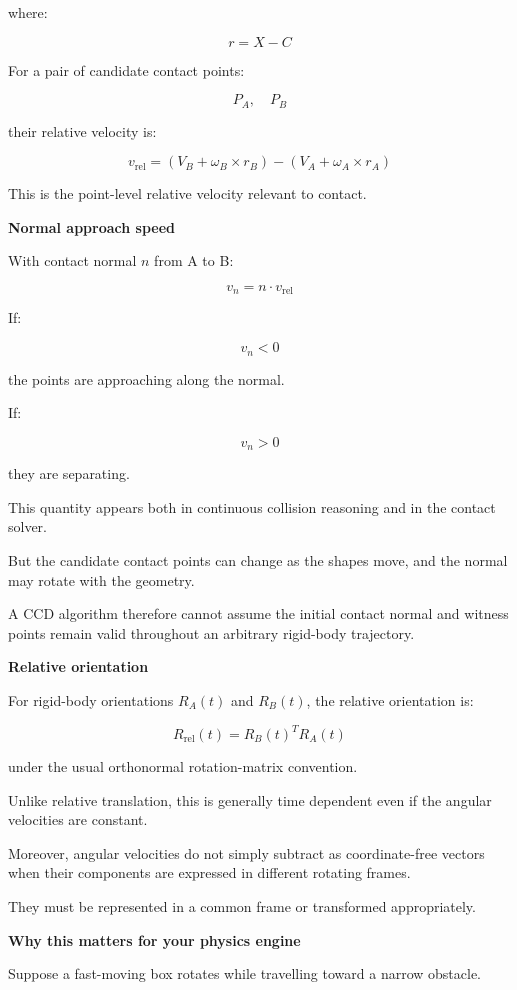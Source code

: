 where:

\[
r=X-C
\]

For a pair of candidate contact points:

\[
P_A,\quad P_B
\]

their relative velocity is:

\[
\boxed{ v_{\mathrm{rel}}= (V_B+\omega_B\times r_B) - (V_A+\omega_A\times r_A) }
\]

This is the point-level relative velocity relevant to contact.

\textbf{Normal approach speed}

With contact normal \(n\) from A to B:

\[
\boxed{ v_n=n\cdot v_{\mathrm{rel}} }
\]

If:

\[
v_n<0
\]

the points are approaching along the normal.

If:

\[
v_n>0
\]

they are separating.

This quantity appears both in continuous collision reasoning and in the contact solver.

But the candidate contact points can change as the shapes move, and the normal may rotate with the geometry.

A CCD algorithm therefore cannot assume the initial contact normal and witness points remain valid throughout an arbitrary rigid-body trajectory.

\textbf{Relative orientation}

For rigid-body orientations \(R_A(t)\) and \(R_B(t)\), the relative orientation is:

\[
\boxed{ R_{\mathrm{rel}}(t)=R_B(t)^TR_A(t) }
\]

under the usual orthonormal rotation-matrix convention.

Unlike relative translation, this is generally time dependent even if the angular velocities are constant.

Moreover, angular velocities do not simply subtract as coordinate-free vectors when their components are expressed in different rotating frames.

They must be represented in a common frame or transformed appropriately.

\textbf{Why this matters for your physics engine}

Suppose a fast-moving box rotates while travelling toward a narrow obstacle.

